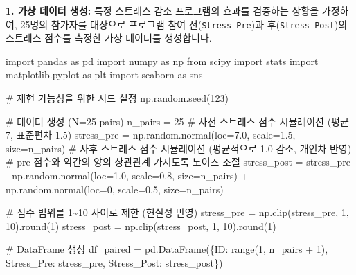 \documentclass[
  letterpaper,
]{book}
\newenvironment{Shaded}{\begin{snugshade}}{\end{snugshade}}
\newcommand{\BuiltInTok}[1]{\textcolor[rgb]{0.00,0.23,0.31}{#1}}
\newcommand{\CommentTok}[1]{\textcolor[rgb]{0.37,0.37,0.37}{#1}}
\newcommand{\DecValTok}[1]{\textcolor[rgb]{0.68,0.00,0.00}{#1}}
\newcommand{\FloatTok}[1]{\textcolor[rgb]{0.68,0.00,0.00}{#1}}
\newcommand{\ImportTok}[1]{\textcolor[rgb]{0.00,0.46,0.62}{#1}}
\newcommand{\NormalTok}[1]{\textcolor[rgb]{0.00,0.23,0.31}{#1}}
\newcommand{\OperatorTok}[1]{\textcolor[rgb]{0.37,0.37,0.37}{#1}}
\newcommand{\StringTok}[1]{\textcolor[rgb]{0.13,0.47,0.30}{#1}}
\begin{document}
\textbf{1. 가상 데이터 생성:} 특정 스트레스 감소 프로그램의 효과를
검증하는 상황을 가정하여, 25명의 참가자를 대상으로 프로그램 참여
전(\texttt{Stress\_Pre})과 후(\texttt{Stress\_Post})의 스트레스 점수를
측정한 가상 데이터를 생성합니다.

\begin{Shaded}
\begin{Highlighting}[]
\ImportTok{import}\NormalTok{ pandas }\ImportTok{as}\NormalTok{ pd}
\ImportTok{import}\NormalTok{ numpy }\ImportTok{as}\NormalTok{ np}
\ImportTok{from}\NormalTok{ scipy }\ImportTok{import}\NormalTok{ stats}
\ImportTok{import}\NormalTok{ matplotlib.pyplot }\ImportTok{as}\NormalTok{ plt}
\ImportTok{import}\NormalTok{ seaborn }\ImportTok{as}\NormalTok{ sns}

\CommentTok{\# 재현 가능성을 위한 시드 설정}
\NormalTok{np.random.seed(}\DecValTok{123}\NormalTok{)}

\CommentTok{\# 데이터 생성 (N=25 pairs)}
\NormalTok{n\_pairs }\OperatorTok{=} \DecValTok{25}
\CommentTok{\# 사전 스트레스 점수 시뮬레이션 (평균 7, 표준편차 1.5)}
\NormalTok{stress\_pre }\OperatorTok{=}\NormalTok{ np.random.normal(loc}\OperatorTok{=}\FloatTok{7.0}\NormalTok{, scale}\OperatorTok{=}\FloatTok{1.5}\NormalTok{, size}\OperatorTok{=}\NormalTok{n\_pairs)}
\CommentTok{\# 사후 스트레스 점수 시뮬레이션 (평균적으로 1.0 감소, 개인차 반영)}
\CommentTok{\# pre 점수와 약간의 양의 상관관계 가지도록 노이즈 조절}
\NormalTok{stress\_post }\OperatorTok{=}\NormalTok{ stress\_pre }\OperatorTok{{-}}\NormalTok{ np.random.normal(loc}\OperatorTok{=}\FloatTok{1.0}\NormalTok{, scale}\OperatorTok{=}\FloatTok{0.8}\NormalTok{, size}\OperatorTok{=}\NormalTok{n\_pairs) }\OperatorTok{+}\NormalTok{ np.random.normal(loc}\OperatorTok{=}\DecValTok{0}\NormalTok{, scale}\OperatorTok{=}\FloatTok{0.5}\NormalTok{, size}\OperatorTok{=}\NormalTok{n\_pairs)}

\CommentTok{\# 점수 범위를 1\textasciitilde{}10 사이로 제한 (현실성 반영)}
\NormalTok{stress\_pre }\OperatorTok{=}\NormalTok{ np.clip(stress\_pre, }\DecValTok{1}\NormalTok{, }\DecValTok{10}\NormalTok{).}\BuiltInTok{round}\NormalTok{(}\DecValTok{1}\NormalTok{)}
\NormalTok{stress\_post }\OperatorTok{=}\NormalTok{ np.clip(stress\_post, }\DecValTok{1}\NormalTok{, }\DecValTok{10}\NormalTok{).}\BuiltInTok{round}\NormalTok{(}\DecValTok{1}\NormalTok{)}

\CommentTok{\# DataFrame 생성}
\NormalTok{df\_paired }\OperatorTok{=}\NormalTok{ pd.DataFrame(\{}\StringTok{\textquotesingle{}ID\textquotesingle{}}\NormalTok{: }\BuiltInTok{range}\NormalTok{(}\DecValTok{1}\NormalTok{, n\_pairs }\OperatorTok{+} \DecValTok{1}\NormalTok{),}
                          \StringTok{\textquotesingle{}Stress\_Pre\textquotesingle{}}\NormalTok{: stress\_pre,}
                          \StringTok{\textquotesingle{}Stress\_Post\textquotesingle{}}\NormalTok{: stress\_post\})}


\end{Highlighting}
\end{Shaded}
\end{document}
